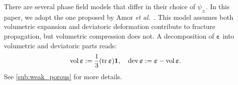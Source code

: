 
There are several phase field models that differ in their choice of $\psi_{\pm}$. In this paper, we {adopt} the one proposed by Amor \emph{et al.}~\cite{Amor09}.
This model %
assumes both volumetric expansion and deviatoric deformation contribute to fracture propagation, but volumetric compression does not. A decomposition of $\bm{\varepsilon}$ into volumetric and deviatoric parts reads:
\begin{equation*}
    \begin{aligned}
        \operatorname{vol}\bm{\varepsilon} := \frac{1}{3} (\operatorname{tr}\bm{\varepsilon}) \mathbf{1}, \quad
        \operatorname{dev}\bm{\varepsilon} := \bm{\varepsilon} - \operatorname{vol}\bm{\varepsilon}.
    \end{aligned}
\end{equation*}
{See \ref{sub:weak_porous} for more details.}


